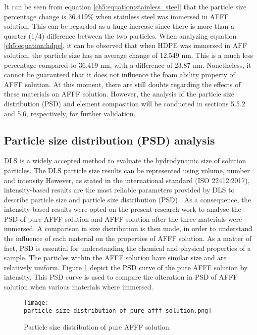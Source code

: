 It can be seen from equation \ref{ch5:equation:stainless_steel} that the particle size percentage change is 36.419\% when stainless steel was immersed in AFFF solution. This can be regarded as a huge increase since there is more than a quarter (1/4) difference between the two particles. When analyzing equation \ref{ch5:equation:hdpe}, it can be observed that when HDPE was immersed in AFF solution, the particle size has an average change of 12.549 nm. This is a much less percentage compared to 36.419 nm, with a difference of 23.87 nm. Nonetheless, it cannot be guaranteed that it does not influence the foam ability property of AFFF solution.  At this moment, there are still doubts regarding the effects of these materials on AFFF solution. However, the analysis of the particle size distribution (PSD) and element composition will be conducted in sections 5.5.2 and 5.6, respectively, for further validation.

\subsection{Particle size distribution (PSD) analysis} 
DLS is a widely accepted method to evaluate the hydrodynamic size of solution particles. The DLS particle size results can be represented using volume, number and intensity However, as stated in the international standard (ISO 22412:2017), intensity-based results are the most reliable parameters provided by DLS to describe particle size and particle size distribution (PSD) \cite{bellamy1980infrared}. As a consequence, the intensity-based results were opted on the present research work to analyse the PSD of pure AFFF solution and AFFF solution after the three materials were immersed. A comparison in size distribution is then made, in order to understand the influence of each material on the properties of AFFF solution. As a matter of fact, PSD is essential for understanding the chemical and physical properties of a sample. The particles within the AFFF solution have similar size and are relatively uniform. Figure \ref{ch5:figure:pure_afff} depict the PSD curve of the pure AFFF solution by intensity. This PSD curve is used to compare the alteration in PSD of AFFF solution when various materials where immersed. 

\begin{figure}[H]
    \centering
    \texttt{[image: particle\_size\_distribution\_of\_pure\_afff\_solution.png]}
    \caption{Particle size distribution of pure AFFF solution.}
    \label{ch5:figure:pure_afff}
\end{figure}

